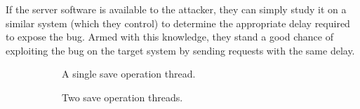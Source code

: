 If the server software is available to the attacker, they can simply study it on a similar system (which they control) to determine the appropriate delay required to expose the bug.
Armed with this knowledge, they stand a good chance of exploiting the bug on the target system by sending requests with the same delay.
\begin{figure}
	\centering
	\begin{subfigure}{.49\columnwidth}
		\caption{A single save operation thread.}
		\label{fig_save_op}
	\end{subfigure}
	\begin{subfigure}{.49\columnwidth}
		\caption{Two save operation threads.}
		\label{fig_two_threads}
	\end{subfigure}
	\begin{subfigure}{.49\columnwidth}

\end{subfigure}
\end{figure}
